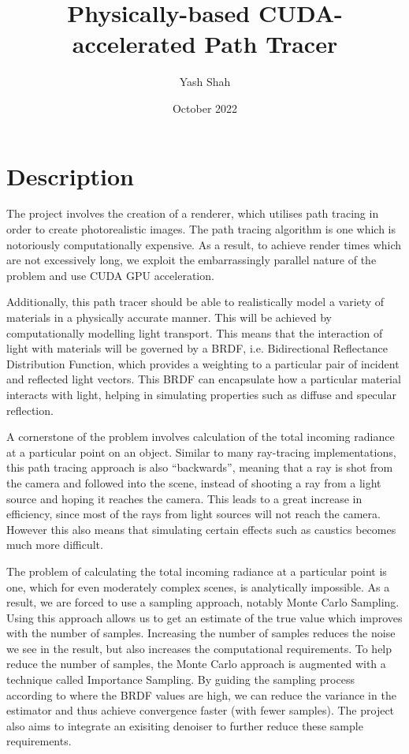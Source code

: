 \documentclass[12pt, a4paper]{article}
\title{Physically-based CUDA-accelerated Path Tracer}
\author{Yash Shah}
\date{October 2022}
\begin{document}
    \maketitle
    
    \section*{Description}
    The project involves the creation of a renderer, which utilises path tracing in order to create photorealistic images. The path tracing algorithm is one which is notoriously computationally expensive. As a result, to achieve render times which are not excessively long, we exploit the embarrassingly parallel nature of the problem and use CUDA GPU acceleration.

    Additionally, this path tracer should be able to realistically model a variety of materials in a physically accurate manner. This will be achieved by computationally modelling light transport. This means that the interaction of light with materials will be governed by a BRDF, i.e. Bidirectional Reflectance Distribution Function, which provides a weighting to a particular pair of incident and reflected light vectors. This BRDF can encapsulate how a particular material interacts with light, helping in simulating properties such as diffuse and specular reflection.

    A cornerstone of the problem involves calculation of the total incoming radiance at a particular point on an object. Similar to many ray-tracing implementations, this path tracing approach is also “backwards”, meaning that a ray is shot from the camera and followed into the scene, instead of shooting a ray from a light source and hoping it reaches the camera. This leads to a great increase in efficiency, since most of the rays from light sources will not reach the camera. However this also means that simulating certain effects such as caustics becomes much more difficult.

    The problem of calculating the total incoming radiance at a particular point is one, which for even moderately complex scenes, is analytically impossible. As a result, we are forced to use a sampling approach, notably Monte Carlo Sampling. Using this approach allows us to get an estimate of the true value which improves with the number of samples. Increasing the number of samples reduces the noise we see in the result, but also increases the computational requirements. To help reduce the number of samples, the Monte Carlo approach is augmented with a technique called Importance Sampling. By guiding the sampling process according to where the BRDF values are high, we can reduce the variance in the estimator and thus achieve convergence faster (with fewer samples). The project also aims to integrate an exisiting denoiser to further reduce these sample requirements.
\end{document}

